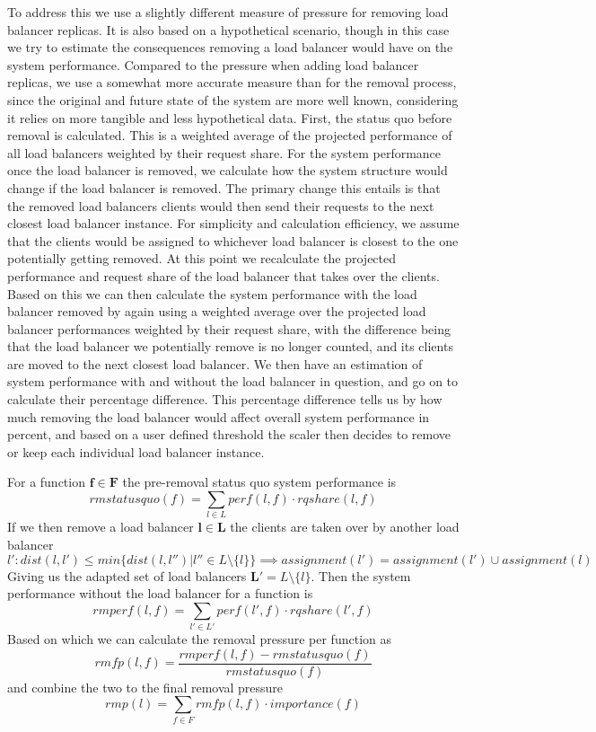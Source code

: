 \documentclass[draft,final]{vutinfth} %
\begin{document}
To address this we use a slightly different measure of pressure for removing load balancer replicas.
It is also based on a hypothetical scenario, though in this case we try to estimate the consequences removing a load balancer would have on the system performance.
Compared to the pressure when adding load balancer replicas, we use a somewhat more accurate measure than for the removal process, since the original and future state of the system are more well known, considering it relies on more tangible and less hypothetical data.
First, the status quo before removal is calculated.
This is a weighted average of the projected performance of all load balancers weighted by their request share.
For the system performance once the load balancer is removed, we calculate how the system structure would change if the load balancer is removed.
The primary change this entails is that the removed load balancers clients would then send their requests to the next closest load balancer instance.
For simplicity and calculation efficiency, we assume that the clients would be assigned to whichever load balancer is closest to the one potentially getting removed.
At this point we recalculate the projected performance and request share of the load balancer that takes over the clients.
Based on this we can then calculate the system performance with the load balancer removed by again using a weighted average over the projected load balancer performances weighted by their request share, with the difference being that the load balancer we potentially remove is no longer counted, and its clients are moved to the next closest load balancer.
We then have an estimation of system performance with and without the load balancer in question, and go on to calculate their percentage difference.
This percentage difference tells us by how much removing the load balancer would affect overall system performance in percent, and based on a user defined threshold the scaler then decides to remove or keep each individual load balancer instance.


For a function $\mathbf{f \in F}$ the pre-removal status quo system performance is
\[rmstatusquo(f) = \sum_{l \in L}perf(l,f) \cdot rqshare(l,f)\]
If we then remove a load balancer $\mathbf{l \in L}$ the clients are taken over by another load balancer
\[l': dist(l,l') \leq min\{dist(l,l'') | l'' \in L \setminus \{l\}\} \implies assignment(l') = assignment(l') \cup assignment(l)\]
Giving us the adapted set of load balancers $\mathbf{L'} = L \setminus \{l\}$. Then the system performance without the load balancer for a function is
\[rmperf(l,f) = \sum_{l' \in L'}perf(l',f) \cdot rqshare(l',f) \]
Based on which we can calculate the removal pressure per function as
\[ rmfp(l,f) = \frac{rmperf(l,f) - rmstatusquo(f)}{rmstatusquo(f)}\]
and combine the two to the final removal pressure
\[rmp(l) = \sum_{f \in F}rmfp(l,f) \cdot importance(f)\]
\end{document}
